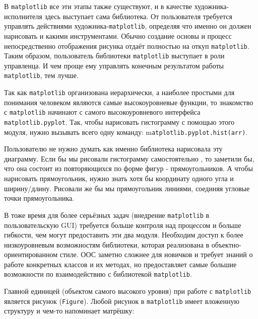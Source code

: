 В \lstinline!matplotlib! все эти этапы также существуют, и в качестве художника-исполнителя здесь выступает сама библиотека. От пользователя требуется управлять действиями художника-\lstinline!matplotlib!, определяя что именно он должен нарисовать и какими инструментами. Обычно создание основы и процесс непосредственно отображения рисунка отдаёт полностью на откуп \lstinline!matplotlib!. Таким образом, пользователь библиотеки \lstinline!matplotlib! выступает в роли управленца. И чем проще ему управлять конечным результатом работы \lstinline!matplotlib!, тем лучше.

Так как \lstinline!matplotlib! организована иерархически, а наиболее простыми для понимания человеком являются самые высокоуровневые функции, то знакомство с \lstinline!matplotlib! начинают с самого высокоуровневого интерфейса \lstinline!matplotlib.pyplot!. Так, чтобы нарисовать гистограмму с помощью этого модуля, нужно вызывать всего одну команду: m\lstinline!atplotlib.pyplot.hist(arr)!.

Пользователю не нужно думать как именно библиотека нарисовала эту диаграмму. Если бы мы рисовали гистограмму самостоятельно , то заметили бы, что она состоит из повторяющихся по форме фигур - прямоугольников. А чтобы нарисовать прямоугольник, нужно знать хотя бы координату одного угла и ширину/длину. Рисовали же бы мы прямоугольник линиями, соединяя угловые точки прямоугольника.

В тоже время для более серьёзных задач (внедрение \lstinline!matplotlib! в пользовательскую GUI) требуется больше контроля над процессом и больше гибкости, чем могут предоставить эти два модуля. Необходим доступ к более низкоуровневым возможностям библиотеки, которая реализована в объектно-ориентированном стиле. ООС заметно сложнее для новичков и требует знаний о работе конкретных классов и их методах, но предоставляет самые большие возможности по взаимодействию с библиотекой \lstinline!matplotlib!.

Главной единицей (объектом самого высокого уровня) при работе с \lstinline!matplotlib! является рисунок (\lstinline!Figure!). Любой рисунок в \lstinline!matplotlib! имеет вложенную структуру и чем-то напоминает матрёшку:

